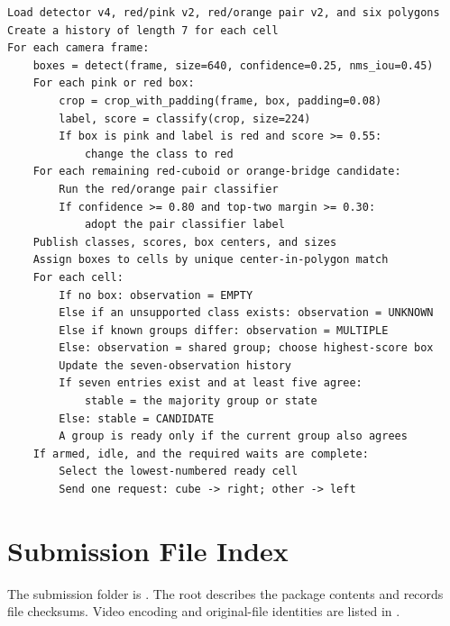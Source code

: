\begin{lstlisting}[caption={Visual processing and request selection in the supplied ROS pipeline}]
Load detector v4, red/pink v2, red/orange pair v2, and six polygons
Create a history of length 7 for each cell
For each camera frame:
    boxes = detect(frame, size=640, confidence=0.25, nms_iou=0.45)
    For each pink or red box:
        crop = crop_with_padding(frame, box, padding=0.08)
        label, score = classify(crop, size=224)
        If box is pink and label is red and score >= 0.55:
            change the class to red
    For each remaining red-cuboid or orange-bridge candidate:
        Run the red/orange pair classifier
        If confidence >= 0.80 and top-two margin >= 0.30:
            adopt the pair classifier label
    Publish classes, scores, box centers, and sizes
    Assign boxes to cells by unique center-in-polygon match
    For each cell:
        If no box: observation = EMPTY
        Else if an unsupported class exists: observation = UNKNOWN
        Else if known groups differ: observation = MULTIPLE
        Else: observation = shared group; choose highest-score box
        Update the seven-observation history
        If seven entries exist and at least five agree:
            stable = the majority group or state
        Else: stable = CANDIDATE
        A group is ready only if the current group also agrees
    If armed, idle, and the required waits are complete:
        Select the lowest-numbered ready cell
        Send one request: cube -> right; other -> left
\end{lstlisting}

\clearpage
\section{Submission File Index}
\label{sec:submission}
The submission folder is . The root  describes the package contents and  records file checksums. Video encoding and original-file identities are listed in .

